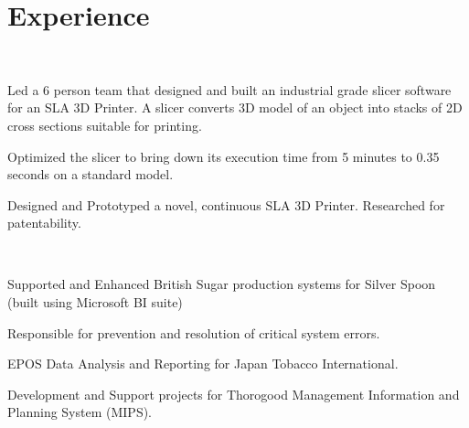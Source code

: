 \documentclass[]{deedy-resume-openfont}
\begin{document}
\begin{minipage}[t]{0.66\textwidth} 



\section{Experience}

\\
\vspace{\topsep}
\begin{tightemize}
\item  Led a 6 person team that designed and built an industrial grade slicer software for an SLA 3D Printer. A slicer converts 3D model of an object into stacks of 2D cross sections suitable for printing.
\item Optimized the slicer to bring down its execution time from 5 minutes to 0.35 seconds on a standard model.
\item Designed and Prototyped a novel, continuous SLA 3D Printer. Researched for patentability.
\end{tightemize}

\sectionsep{}

\\
\vspace{\topsep} %
\begin{tightemize}
\item Supported and Enhanced British Sugar production systems for Silver Spoon (built using Microsoft BI suite)
	\item Responsible for prevention and resolution of critical system errors. 
	\item EPOS Data Analysis and Reporting for Japan Tobacco International.
	\item Development and Support projects for Thorogood Management Information and Planning System (MIPS).
\end{tightemize}
\sectionsep




\end{minipage}
\end{document}
